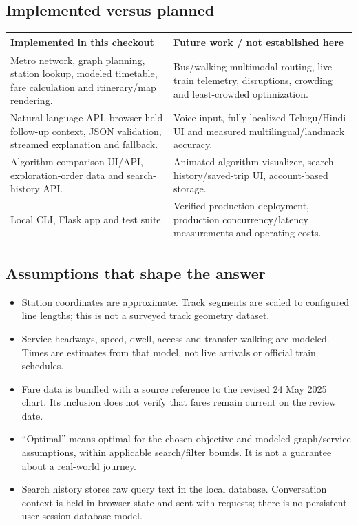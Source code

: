 \documentclass[10pt,a4paper]{article}
\begin{document}
\subsection{Implemented versus planned}
\begin{tabularx}{\linewidth}{@{}X X@{}}
\toprule
\textbf{Implemented in this checkout} & \textbf{Future work / not established here}\\\midrule
Metro network, graph planning, station lookup, modeled timetable, fare calculation and itinerary/map rendering. & Bus/walking multimodal routing, live train telemetry, disruptions, crowding and least-crowded optimization.\\
Natural-language API, browser-held follow-up context, JSON validation, streamed explanation and fallback. & Voice input, fully localized Telugu/Hindi UI and measured multilingual/landmark accuracy.\\
Algorithm comparison UI/API, exploration-order data and search-history API. & Animated algorithm visualizer, search-history/saved-trip UI, account-based storage.\\
Local CLI, Flask app and test suite. & Verified production deployment, production concurrency/latency measurements and operating costs.\\\bottomrule
\end{tabularx}

\subsection{Assumptions that shape the answer}
\begin{itemize}
\item Station coordinates are approximate. Track segments are scaled to configured line lengths; this is not a surveyed track geometry dataset.
\item Service headways, speed, dwell, access and transfer walking are modeled. Times are estimates from that model, not live arrivals or official train schedules.
\item Fare data is bundled with a source reference to the revised 24 May 2025 chart. Its inclusion does not verify that fares remain current on the review date.
\item ``Optimal'' means optimal for the chosen objective and modeled graph/service assumptions, within applicable search/filter bounds. It is not a guarantee about a real-world journey.
\item Search history stores raw query text in the local database. Conversation context is held in browser state and sent with requests; there is no persistent user-session database model.
\end{itemize}
\end{document}
